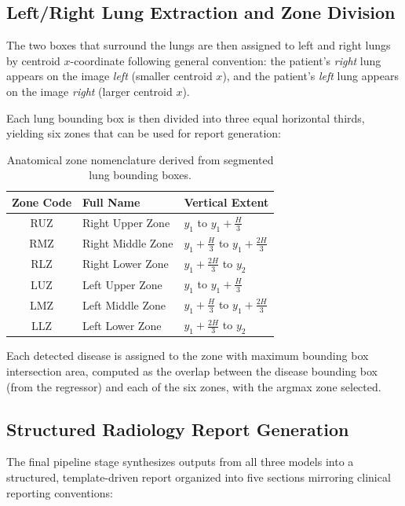 \subsection{Left/Right Lung Extraction and Zone Division}

The two boxes that surround the lungs are then assigned to left and right lungs by centroid $x$-coordinate following general convention: the patient's \emph{right} lung appears on the image \emph{left} (smaller centroid $x$), and the patient's \emph{left} lung appears on the image \emph{right} (larger centroid $x$).

Each lung bounding box is then divided into three equal horizontal thirds, yielding six zones that can be used for report generation:

\begin{table}[ht]
\centering
\caption{Anatomical zone nomenclature derived from segmented lung bounding boxes.}
\label{tab:zones}
\renewcommand{\arraystretch}{1.3}
\begin{tabular}{cll}
\toprule
\textbf{Zone Code} & \textbf{Full Name} & \textbf{Vertical Extent} \\
\midrule
RUZ & Right Upper Zone  & $y_1$ to $y_1 + \frac{H}{3}$ \\
RMZ & Right Middle Zone & $y_1 + \frac{H}{3}$ to $y_1 + \frac{2H}{3}$ \\
RLZ & Right Lower Zone  & $y_1 + \frac{2H}{3}$ to $y_2$ \\
LUZ & Left Upper Zone   & $y_1$ to $y_1 + \frac{H}{3}$ \\
LMZ & Left Middle Zone  & $y_1 + \frac{H}{3}$ to $y_1 + \frac{2H}{3}$ \\
LLZ & Left Lower Zone   & $y_1 + \frac{2H}{3}$ to $y_2$ \\
\bottomrule
\end{tabular}
\end{table}

Each detected disease is assigned to the zone with maximum bounding box intersection area, computed as the overlap between the disease bounding box (from the regressor) and each of the six zones, with the argmax zone selected.

\subsection{Structured Radiology Report Generation}

The final pipeline stage synthesizes outputs from all three models into a structured, template-driven report organized into five sections mirroring clinical reporting conventions:

